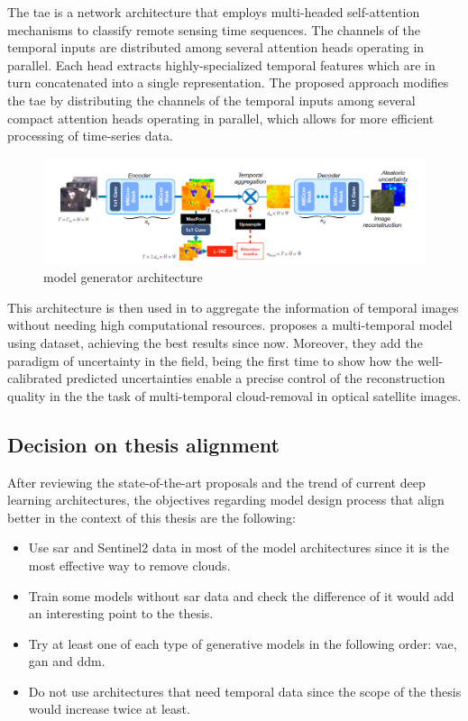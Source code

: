 \documentclass[../main.tex]{subfiles}
\begin{document}
The  \gls{tae} is a network architecture that employs multi-headed self-attention mechanisms to classify remote sensing time sequences. The channels of the temporal inputs are distributed among several attention heads operating in parallel. Each head extracts highly-specialized temporal features which are in turn concatenated into a single representation. The proposed approach modifies the \gls{tae} by distributing the channels of the temporal inputs among several compact attention heads operating in parallel, which allows for more efficient processing of time-series data. 
\begin{figure}[H]
	\centering
	\includegraphics[width=15cm]{imgs/relatedwork/uncertainty}
	\caption{\cite{uncrtaints2021ebel} model generator architecture}
\end{figure}
This architecture is then used in \cite{uncrtaints2021ebel} to aggregate the information of temporal images without needing high computational resources. \cite{uncrtaints2021ebel} proposes a multi-temporal model using \cite{sen12mscrts} dataset, achieving the best results since now. Moreover, they add the paradigm of uncertainty in the field, being the first time to show how the well-calibrated predicted uncertainties
enable a precise control of the reconstruction quality in the the task of multi-temporal
cloud-removal in optical satellite images.

\subsection{Decision on thesis alignment}
After reviewing the state-of-the-art proposals and the trend of current deep learning architectures, the objectives regarding model design process that align better in the context of this thesis are the following:
\begin{itemize}
	\item Use \gls{sar} and Sentinel2 data in most of the model architectures since it is the most effective way to remove clouds.
	\item Train some models without \gls{sar} data and check the difference of it would add an interesting point to the thesis.
	\item Try at least one of each type of generative models in the following order: \gls{vae}, \gls{gan} and \gls{ddm}.
	\item Do not use architectures that need temporal data since the scope of the thesis would increase twice at least.
\end{itemize}
\end{document}
